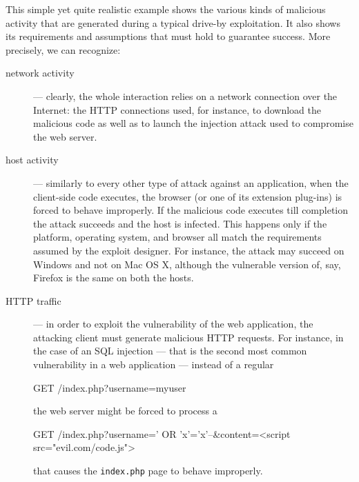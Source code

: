 \documentclass[12pt]{article}
\theoremstyle{definition}
\begin{document}
		This simple yet quite realistic example shows the various kinds of
		malicious activity that are generated during a typical drive-by
		exploitation\cite{Saeed2016}. It also shows its requirements and assumptions that must
		hold to guarantee success. More precisely, we can recognize:
		
		\begin{description}
			\item[network activity] --- clearly, the whole interaction relies on a
			network connection over the Internet: the HTTP connections
			used, for instance, to download the malicious code as well as to
			launch the injection attack used to compromise the web server.
			\item[host activity] --- similarly to every other type of attack
			against an application, when the client-side code executes, the
			browser (or one of its extension plug-ins) is forced to behave
			improperly. If the malicious code executes till completion the
			attack succeeds and the host is infected. This happens only if the
			platform, operating system, and browser all match the requirements
			assumed by the exploit designer. For instance, the attack may
			succeed on \textsf{Windows} and not on \textsf{Mac OS X}, although
			the vulnerable version of, say, \textsf{Firefox} is the same on both
			the hosts.
			\item[HTTP traffic] --- in order to exploit the vulnerability of the
			web application, the attacking client must generate malicious
			HTTP requests. For instance, in the case of an SQL
			injection --- that is the second most common vulnerability in a web
			application --- instead of a regular
			
			\begin{logs}
GET /index.php?username=myuser 
			\end{logs}
			
			\noindent the web server might be forced to process a
			
			\begin{logs}
GET /index.php?username=' OR 'x'='x'--\&content=<script
src="evil.com/code.js">
			\end{logs}
			
			\noindent that causes the \texttt{index.php} page to behave
			improperly.
		\end{description}
		
\end{document}
